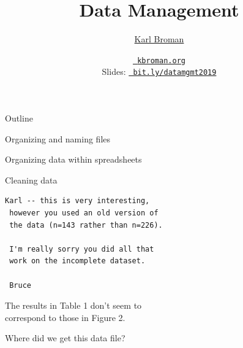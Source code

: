 \documentclass[aspectratio=169,12pt,t]{beamer}
\title{Data Management}
\author{\href{https://kbroman.org}{Karl Broman}}
\institute{Biostatistics \& Medical Informatics \\ Univ.\ Wisconsin{\textendash}Madison}
\date{\href{https://kbroman.org}{\tt \scriptsize \color{foreground} kbroman.org}
\\[2pt]
\scriptsize {\lolit Slides:} \href{https://bit.ly/datamgmt2019}{\tt \scriptsize
  \color{foreground} bit.ly/datamgmt2019}
}
\begin{document}
{
 }


\begin{frame}[c]{Outline}

  \bbi
\item Organizing and naming files
\item Organizing data within spreadsheets
\item Cleaning data
  \ei

\end{frame}



\begin{frame}[fragile,c]{}

\begin{center}
\begin{minipage}[c]{9.3cm}
\begin{semiverbatim}
\lstset{basicstyle=\normalsize}
\begin{lstlisting}[linewidth=9.3cm]
 Karl -- this is very interesting,
 however you used an old version of
 the data (n=143 rather than n=226).

 I'm really sorry you did all that
 work on the incomplete dataset.

 Bruce
\end{lstlisting}
\end{semiverbatim}
\end{minipage}
\end{center}

\end{frame}


\begin{frame}[c]{}
\centering
{\Large The results in Table 1 don't seem to \\[12pt]
correspond to those in Figure 2.}

\end{frame}



\begin{frame}[c]{}
\centerline{\Large Where did we get this data file?}
\end{frame}
\end{document}
